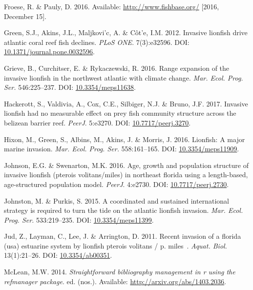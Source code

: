 \documentclass[12pt,]{article}
\begin{document}
\hypertarget{ref-froese_website_2016}{}
Froese, R. \& Pauly, D. 2016. Available: \url{http://www.fishbase.org/}
{[}2016, December 15{]}.

\hypertarget{ref-green_2012}{}
Green, S.J., Akins, J.L., Maljkovi\a'c, A. \& Côt\a'e, I.M. 2012.
Invasive lionfish drive atlantic coral reef fish declines. \emph{PLoS
ONE}. 7(3):e32596. DOI:
\href{https://doi.org/10.1371/journal.pone.0032596}{10.1371/journal.pone.0032596}.

\hypertarget{ref-grieve_2016}{}
Grieve, B., Curchitser, E. \& Rykaczewski, R. 2016. Range expansion of
the invasive lionfish in the northwest atlantic with climate change.
\emph{Mar. Ecol. Prog. Ser.} 546:225--237. DOI:
\href{https://doi.org/10.3354/meps11638}{10.3354/meps11638}.

\hypertarget{ref-hackerott_2017}{}
Hackerott, S., Valdivia, A., Cox, C.E., Silbiger, N.J. \& Bruno, J.F.
2017. Invasive lionfish had no measurable effect on prey fish community
structure across the belizean barrier reef. \emph{PeerJ}. 5:e3270. DOI:
\href{https://doi.org/10.7717/peerj.3270}{10.7717/peerj.3270}.

\hypertarget{ref-hixon_2016}{}
Hixon, M., Green, S., Albins, M., Akins, J. \& Morris, J. 2016.
Lionfish: A major marine invasion. \emph{Mar. Ecol. Prog. Ser.}
558:161--165. DOI:
\href{https://doi.org/10.3354/meps11909}{10.3354/meps11909}.

\hypertarget{ref-johnson_2016}{}
Johnson, E.G. \& Swenarton, M.K. 2016. Age, growth and population
structure of invasive lionfish (pterois volitans/miles) in northeast
florida using a length-based, age-structured population model.
\emph{PeerJ}. 4:e2730. DOI:
\href{https://doi.org/10.7717/peerj.2730}{10.7717/peerj.2730}.

\hypertarget{ref-johnston_2015}{}
Johnston, M. \& Purkis, S. 2015. A coordinated and sustained
international strategy is required to turn the tide on the atlantic
lionfish invasion. \emph{Mar. Ecol. Prog. Ser.} 533:219--235. DOI:
\href{https://doi.org/10.3354/meps11399}{10.3354/meps11399}.

\hypertarget{ref-jud_2011}{}
Jud, Z., Layman, C., Lee, J. \& Arrington, D. 2011. Recent invasion of a
florida (usa) estuarine system by lionfish pterois volitans / p. miles~.
\emph{Aquat. Biol.} 13(1):21--26. DOI:
\href{https://doi.org/10.3354/ab00351}{10.3354/ab00351}.

\hypertarget{ref-RefManager_2014}{}
McLean, M.W. 2014. \emph{Straightforward bibliography management in r
using the refmanager package}. ed. (nos.). Available:
\url{http://arxiv.org/abs/1403.2036}.
\end{document}

